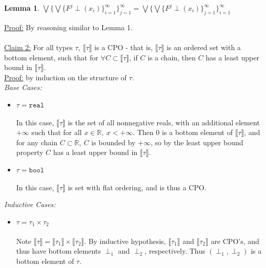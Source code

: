 \documentclass{westhesis}
\theoremstyle{plain}
\newtheorem{lemma}[thm]{Lemma}
\theoremstyle{definition}
\newcommand{\R}{\mathbb{R}}
\begin{document}
\begin{HEAD}
 \begin{lemma}
 $\bigvee\{\bigvee\{F^j \perp(x_i)\}^{\infty}_{i=1}\}^{\infty}_{j=1} = \bigvee\{\bigvee\{F^j \perp(x_i)\}^{\infty}
 _{j=1}\}^{\infty}_{i=1}$\\ 
\end{lemma}
 \underline{Proof:} By reasoning similar to Lemma 1. \\ \\
\underline{Claim 2:} For all types $\tau, \ \llbracket \tau \rrbracket$ is a CPO - that is, $\llbracket \tau \rrbracket$ is an ordered 
set with a bottom element, such that for $\forall C \subset \llbracket \tau \rrbracket$, if  $C$ is a chain, then $C$ has a least 
upper bound in $\llbracket \tau \rrbracket$. \\
\underline{Proof:} by induction on the structure of $\tau$. \\
\emph{Base Cases: }
\begin{itemize}
\item $\tau = \texttt{real}$ \\ \\
In this case, $\llbracket \tau \rrbracket$ is the set of all nonnegative reals, with an additional element $+\infty$ such that for all
$x \in \R, \ x < +\infty$. Then $0$ is a bottom element of $\llbracket \tau \rrbracket$, and for any chain $C \subset \R, \ C$ is bounded by $+\infty$, so by the least upper bound property $C$ has a least upper bound in $\llbracket \tau \rrbracket$.
\item $\tau = \texttt{bool}$ \\ \\
In this case, $\llbracket \tau \rrbracket$ is set with flat ordering, and is thus a CPO. \\ 
\end{itemize}
\emph{Inductive Cases: }
\begin{itemize}
\item $\tau = \tau_1 \times \tau_2$ \\ \\
Note $\llbracket \tau \rrbracket = \llbracket \tau_1 \rrbracket \times \llbracket \tau_2 \rrbracket$. By inductive hypothesis,
$\llbracket \tau_1 \rrbracket$ and $\llbracket \tau_2 \rrbracket$ are CPO's, and thus have bottom elements $\perp_1$ and $
\perp_2$, respectively. Thus $(\perp_1, \perp_2)$ is a bottom element of $\tau$. 


\end{itemize}
\end{HEAD}
\end{document}
